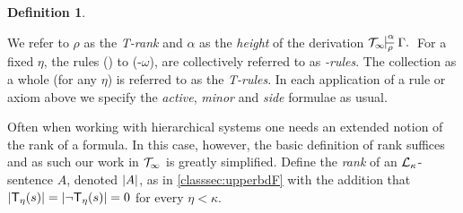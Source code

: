 \documentclass[UKenglish,cleveref,DIV=12]{scrartcl}
\let\forall\forallAlt
\theoremstyle{definition}
\newtheorem{definition}[lemma]{Definition}
\theoremstyle{definition}
\begin{document}
\begin{definition}
\end{definition}
We refer to $\rho$ as the {\em T-rank} and $\alpha$ as the {\em height} of the derivation $\Tinfty\prov\alpha{}$ For a fixed $\eta$, the rules (\Imp\eta) to (\textT\eta-$\omega$), are collectively referred to as {\em \textT\eta-rules}. The collection as a whole (for any $\eta$) is referred to as the {\em T-rules}. In each application of a rule or axiom above we specify the {\em active}, {\em minor} and {\em side} formulae as usual.

Often when working with hierarchical systems one needs an extended notion of the
rank of a formula. In this case, however, the basic definition of rank suffices
and as such our work in $\mathcal{T}_\infty$ is greatly simplified. Define the {\em rank}
of an $\mathcal{L}_\kappa$-sentence $A$, denoted $\lvert{A}\rvert$, as in \cref{classsec:upperbdF} with the addition that $==0$ for every $\eta<\kappa$.
\end{document}
